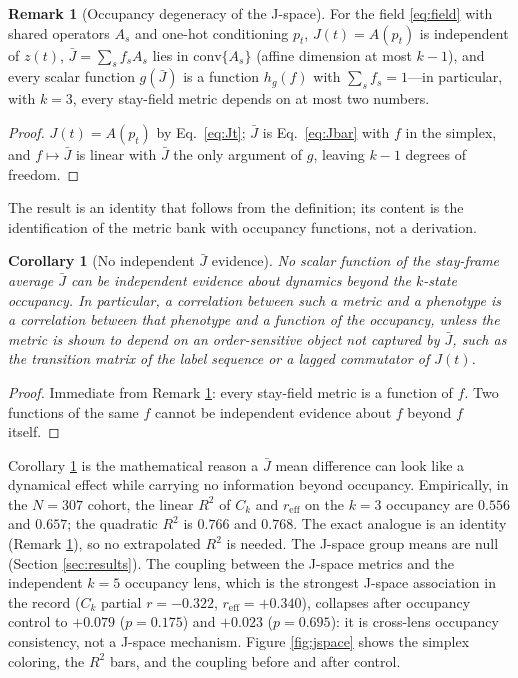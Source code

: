 \documentclass[11pt]{article}
\newtheorem{corollary}{Corollary}
\theoremstyle{definition}
\newtheorem{remark}{Remark}
\begin{document}
\begin{remark}[Occupancy degeneracy of the J-space]
\label{thm:occupancy}
For the field \eqref{eq:field} with shared operators $A_s$ and one-hot conditioning
$p_t$, $J(t)=A(p_t)$ is independent of $z(t)$, $\bar J=\sum_s f_s A_s$ lies in
$\mathrm{conv}\{A_s\}$ (affine dimension at most $k-1$), and every scalar function
$g(\bar J)$ is a function $h_g(f)$ with $\sum_s f_s=1$---in particular, with $k=3$,
every stay-field metric depends on at most two numbers.
\end{remark}

\begin{proof}
$J(t)=A(p_t)$ by Eq.~\eqref{eq:Jt}; $\bar J$ is Eq.~\eqref{eq:Jbar} with $f$ in the
simplex, and $f\mapsto\bar J$ is linear with $\bar J$ the only argument of $g$, leaving
$k-1$ degrees of freedom.
\end{proof}

The result is an identity that follows from the definition; its content is the
identification of the metric bank with occupancy functions, not a derivation.

\begin{corollary}[No independent $\bar J$ evidence]
\label{cor:noindependent}
No scalar function of the stay-frame average $\bar J$ can be independent evidence about
dynamics beyond the $k$-state occupancy. In particular, a correlation between such a
metric and a phenotype is a correlation between that phenotype and a function of the
occupancy, unless the metric is shown to depend on an order-sensitive object not captured
by $\bar J$, such as the transition matrix of the label sequence or a lagged commutator
of $J(t)$.
\end{corollary}

\begin{proof}
Immediate from Remark \ref{thm:occupancy}: every stay-field metric is a function of
$f$. Two functions of the same $f$ cannot be independent evidence about $f$ beyond $f$
itself.
\end{proof}

Corollary \ref{cor:noindependent} is the mathematical reason a $\bar J$ mean difference
can look like a dynamical effect while carrying no information beyond occupancy.
Empirically, in the $N=307$ cohort, the linear $R^2$ of $C_k$ and $r_{\mathrm{eff}}$ on
the $k=3$ occupancy are $0.556$ and $0.657$; the
quadratic $R^2$ is $0.766$ and $0.768$. The exact analogue is an identity
(Remark \ref{thm:occupancy}), so no extrapolated $R^2$ is needed. The J-space group
means are null (Section \ref{sec:results}). The coupling between the J-space metrics and
the independent $k=5$ occupancy lens, which is the strongest J-space association in the
record ($C_k$ partial $r=-0.322$, $r_{\mathrm{eff}}=+0.340$), collapses after occupancy
control to $+0.079$ ($p=0.175$) and $+0.023$ ($p=0.695$): it is cross-lens occupancy
consistency, not a J-space mechanism. Figure \ref{fig:jspace} shows the simplex
coloring, the $R^2$ bars, and the coupling before and after control.
\end{document}
